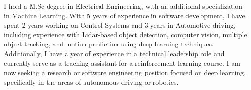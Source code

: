 I hold a M.Sc degree in Electrical Engineering, with an additional specialization in Machine Learning. With 5 years of experience in software development, I have spent 2 years working on Control Systems and 3 years in Automotive driving, including experience with Lidar-based object detection, computer vision, multiple object tracking, and motion prediction using deep learning techniques. Additionally, I have a year of experience in a technical leadership role and currently serve as a teaching assistant for a reinforcement learning course. I am now seeking a research or software engineering position focused on deep learning, specifically in the areas of autonomous driving or robotics.